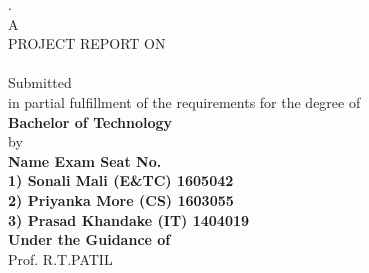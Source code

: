 \documentclass[12pt,a4paper]{article}
\begin{document}
\thisfancypage{
   \setlength{\fboxsep}{10pt}\doublebox}{}
 



\begin{center}
.\\
A\\
\vspace{0.1in}
PROJECT REPORT ON\\
\vspace{0.1in}
\textbf{\large{\color{titlepro}{"IOT BAESD SMART ENERGY MONITORING AND CONTROLLING DEVICE"}}}\\
\vspace{0.5cm}
Submitted\\
\vspace{0.1in}
in partial fulfillment of the requirements for the degree of\\
\vspace{0.1in}
\textbf{Bachelor of Technology}\\
\vspace{0.1in}
by\\
\vspace{0.1in}
\textbf{ \hspace{1cm}Name \hspace{5cm} Exam Seat No. \\ }
\vspace{0.1in}
\textbf{ \hspace{-1cm}1) Sonali Mali (E\&TC)\hspace{4.4cm} 1605042\\ }
\vspace{0.1in}
\textbf{ \hspace{-1cm}2) Priyanka More (CS)\hspace{4.4cm} 1603055\\ }
\vspace{0.1in}
\textbf{ \hspace{-1cm}3) Prasad Khandake (IT)\hspace{4.0cm} 1404019\\ }
\vspace{0.1in}
\vspace{0.5cm}
\textbf{Under the Guidance of}\\
\vspace{0.2cm}
Prof. R.T.PATIL\\

\end{center}
\end{document}

